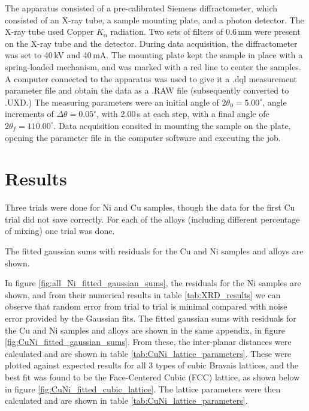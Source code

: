 \documentclass[12pt]{article}
\begin{document}
The apparatus consisted of a pre-calibrated Siemens diffractometer, which consisted of an X-ray tube, 
a sample mounting plate, and a photon detector. The X-ray tube used Copper $K_{\alpha}$ radiation. 
Two sets of filters of 0.6\,mm were present on the X-ray tube and the detector. During data acquisition, the diffractometer was set to 
40\,kV and 40\,mA. The mounting plate kept the sample in place with a spring-loaded mechanism, 
and was marked with a red line to center the samples.
A computer connected to the apparatus was used to give it a .dql measurement parameter file and 
obtain the data as a .RAW file (subsequently converted to .UXD.) 
 The measuring parameters were an initial angle of $2\theta_0=5.00^{\circ}$, 
angle increments of $\Delta\theta=0.05^{\circ}$, with 2.00\,s at each step, with a final 
angle ofe $2\theta_f=110.00^{\circ}$.
Data acquisition consited in mounting the sample on the plate, opening the parameter file in 
the computer software and executing the job.



\section{Results}\label{sec:res}

Three trials were done for Ni and Cu samples, though the data for the first Cu trial did not save correctly. 
For each of the alloys (including different percentage of mixing) 
one trial was done. 

The fitted gaussian sums with residuals for the Cu and Ni samples and alloys are shown.

In figure \ref{fig:all_Ni_fitted_gaussian_sums}, the residuals for the Ni samples are shown, and from
their numerical results in table \ref{tab:XRD_results} we can observe that random error from trial to trial is minimal compared
with noise error provided by the Gaussian fits. The fitted gaussian sums with residuals for the Cu and Ni samples and alloys are shown
in the same appendix, in figure \ref{fig:CuNi_fitted_gaussian_sums}. From these, the inter-planar distances were
calculated and are shown in table \ref{tab:CuNi_lattice_parameters}. These were plotted against expected results for all 3
types of cubic Bravais lattices, and the best fit was found to be the Face-Centered Cubic (FCC) lattice, as shown
below in figure \ref{fig:CuNi_fitted_cubic_lattice}. The lattice parameters were then calculated and are shown
in table \ref{tab:CuNi_lattice_parameters}.
\end{document}
